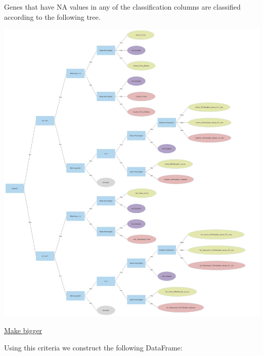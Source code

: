\documentclass[11pt]{article}
\begin{document}
Genes that have NA values in any of the classification columns are classified according to the following tree.
\begin{center}
\includegraphics[width=.9\linewidth]{./Plots/active_genes_NAs.jpg}
\end{center}

\href{Plots/active\_genes\_NAs.jpg}{Make bigger}

Using this criteria we construct the following DataFrame:
\end{document}
